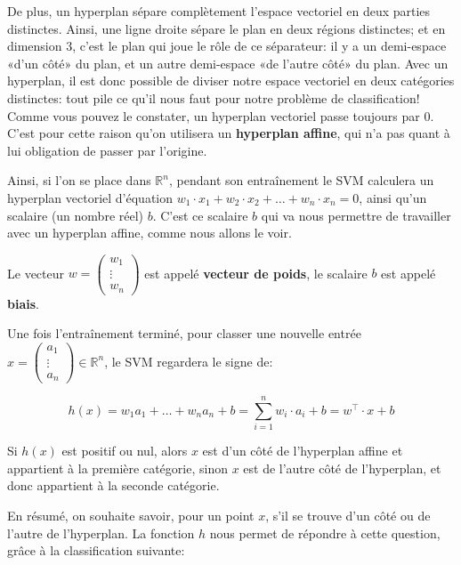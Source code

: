 \documentclass{article}
\begin{document}
De plus, un hyperplan sépare complètement l’espace vectoriel en deux parties distinctes. Ainsi, une ligne droite sépare le plan en deux régions distinctes; et en dimension $3$, c’est le plan qui joue le rôle de ce séparateur: il y a un demi-espace «d’un côté» du plan, et un autre demi-espace «de l’autre côté» du plan. Avec un hyperplan, il est donc possible de diviser notre espace vectoriel en deux catégories distinctes: tout pile ce qu’il nous faut pour notre problème de classification!
\vspace{5mm} %
Comme vous pouvez le constater, un hyperplan vectoriel passe toujours par $0$. C’est pour cette raison qu’on utilisera un \textbf{hyperplan affine}, qui n’a pas quant à lui obligation de passer par l’origine.



Ainsi, si l’on se place dans $\mathbb{R}^n$, pendant son entraînement le SVM calculera un hyperplan vectoriel d’équation $w_1 \cdot x_1 + w_2\cdot x_2+ \dots +w_n\cdot x_n=0$, ainsi qu’un scalaire (un nombre réel) $b$. C’est ce scalaire $b$ qui va nous permettre de travailler avec un hyperplan affine, comme nous allons le voir.



Le vecteur $w= \left( \begin{array}{c} w_1 \\ \vdots \\ w_n \end{array} \right)$ est appelé \textbf{vecteur de poids}, le scalaire $b$ est appelé \textbf{biais}.



Une fois l’entraînement terminé, pour classer une nouvelle entrée $x=\left( \begin{array}{c} a_1 \\ \vdots \\ a_n \end{array} \right) \in \mathbb{R}^n$, le SVM regardera le signe de:



$$h(x)= w_1 a_1 + \dots + w_n a_n + b = \sum_{i=1}^n w_i \cdot a_i+b = w^\top \cdot x+b$$



Si $h(x)$ est positif ou nul, alors $x$ est d’un côté de l’hyperplan affine et appartient à la première catégorie, sinon $x$ est de l’autre côté de l’hyperplan, et donc appartient à la seconde catégorie.



En résumé, on souhaite savoir, pour un point $x$, s’il se trouve d’un côté ou de l’autre de l’hyperplan. La fonction $h$ nous permet de répondre à cette question, grâce à la classification suivante:
\end{document}
